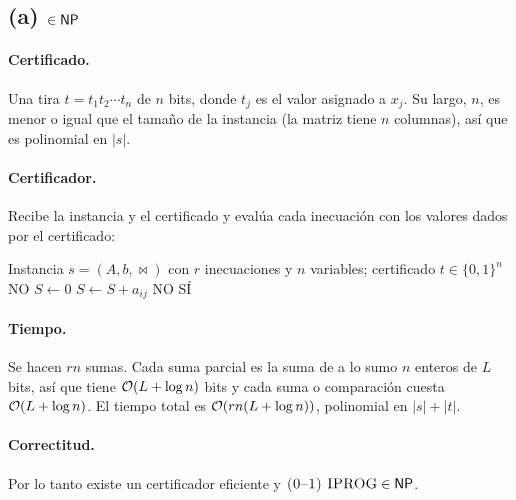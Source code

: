 \subsection*{(a) \IPROG{} $\in\mathsf{NP}$}

\paragraph{Certificado.} Una tira $t=t_1t_2\cdots t_n$ de $n$ bits, donde $t_j$ es el valor asignado a $x_j$.
Su largo, $n$, es menor o igual que el tamaño de la instancia (la matriz tiene $n$ columnas), así que es
polinomial en $|s|$.

\paragraph{Certificador.} Recibe la instancia y el certificado y evalúa cada inecuación con los valores
dados por el certificado:
\begin{algorithm}[H]
\caption{Certificador de \IPROG}
\begin{algorithmic}[1]
\Require Instancia $s=(A,b,\bowtie)$ con $r$ inecuaciones y $n$ variables; certificado $t\in\{0,1\}^n$
 \State \Return NO \EndIf
{}
  \State $S\gets 0$
     \State $S\gets S+a_{ij}$ \EndIf
  \EndFor
   \State \Return NO \EndIf
\EndFor
\State \Return SÍ
\end{algorithmic}
\end{algorithm}

\paragraph{Tiempo.} Se hacen $rn$ sumas. Cada suma parcial es la suma de a lo sumo $n$ enteros de $L$ bits,
así que tiene $\mathcal{O}(L+\log n)$ bits y cada suma o comparación cuesta $\mathcal{O}(L+\log n)$. El tiempo total es
$\mathcal{O}(rn(L+\log n))$, polinomial en $|s|+|t|$.

\paragraph{Correctitud.}
Por lo tanto existe un certificador eficiente y $\textsc{(0--1) IPROG}\in\mathsf{NP}$.

